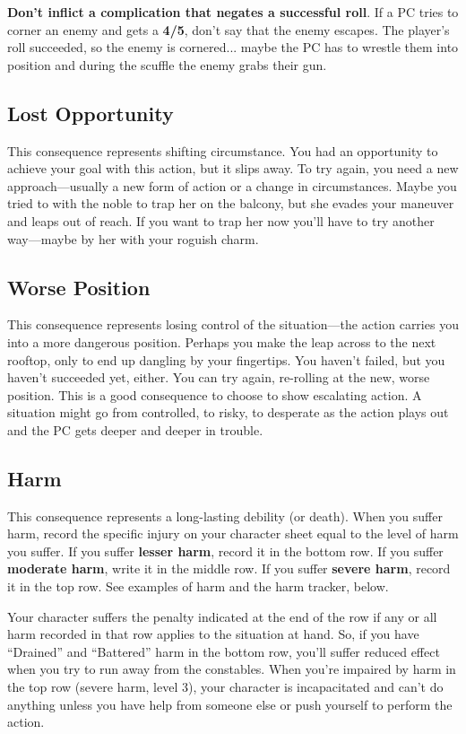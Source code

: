 \textbf{Don’t inflict a complication that negates a successful roll}. If a PC tries to corner an enemy and gets a \textbf{4/5}, don’t say that the enemy escapes. The player’s roll succeeded, so the enemy is cornered... maybe the PC has to wrestle them into position and during the scuffle the enemy grabs their gun.

\subsection{Lost Opportunity}

This consequence represents shifting circumstance. You had an opportunity to achieve your goal with this action, but it slips away. To try again, you need a new approach—usually a new form of action or a change in circumstances. Maybe you tried to  with the noble to trap her on the balcony, but she evades your maneuver and leaps out of reach. If you want to trap her now you’ll have to try another way—maybe by  her with your roguish charm.

\subsection{Worse Position}

This consequence represents losing control of the situation—the action carries you into a more dangerous position. Perhaps you make the leap across to the next rooftop, only to end up dangling by your fingertips. You haven’t failed, but you haven’t succeeded yet, either. You can try again, re-rolling at the new, worse position. This is a good consequence to choose to show escalating action. A situation might go from controlled, to risky, to desperate as the action plays out and the PC gets deeper and deeper in trouble.

\subsection{Harm}

This consequence represents a long-lasting debility (or death). When you suffer harm, record the specific injury on your character sheet equal to the level of harm you suffer. If you suffer \textbf{lesser harm}, record it in the bottom row. If you suffer \textbf{moderate harm}, write it in the middle row. If you suffer \textbf{severe harm}, record it in the top row. See examples of harm and the harm tracker, below.

Your character suffers the penalty indicated at the end of the row if any or all harm recorded in that row applies to the situation at hand. So, if you have ``Drained'' and ``Battered'' harm in the bottom row, you’ll suffer reduced effect when you try to run away from the constables. When you’re impaired by harm in the top row (severe harm, level 3), your character is incapacitated and can’t do anything unless you have help from someone else or push yourself to perform the action.

